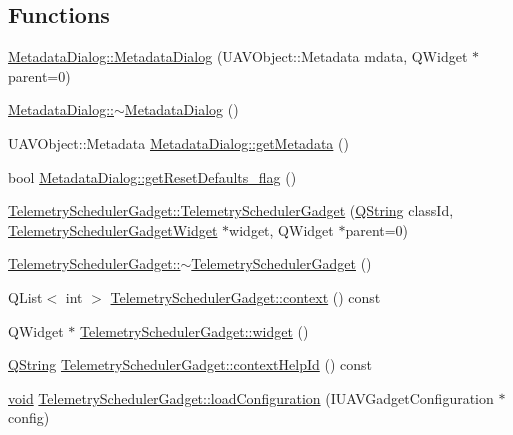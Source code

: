 \subsection*{\-Functions}
\begin{DoxyCompactItemize}
\item 
\hyperlink{group___telemetry_scheduler_gadget_plugin_gae7a09a21f10b02c9cfbeca46cf5f8d3d}{\-Metadata\-Dialog\-::\-Metadata\-Dialog} (\-U\-A\-V\-Object\-::\-Metadata mdata, \-Q\-Widget $\ast$parent=0)
\item 
\hyperlink{group___telemetry_scheduler_gadget_plugin_gae1f623f8f053ac2dc1582cde50cd2d05}{\-Metadata\-Dialog\-::$\sim$\-Metadata\-Dialog} ()
\item 
\-U\-A\-V\-Object\-::\-Metadata \hyperlink{group___telemetry_scheduler_gadget_plugin_ga909d83e32704eef90c21a022a185f359}{\-Metadata\-Dialog\-::get\-Metadata} ()
\item 
bool \hyperlink{group___telemetry_scheduler_gadget_plugin_gac9372736e58b592c6cb67f4c68b3e3ec}{\-Metadata\-Dialog\-::get\-Reset\-Defaults\-\_\-flag} ()
\item 
\hyperlink{group___telemetry_scheduler_gadget_plugin_gad6c9a0ecdc6864a13ced085537fef8de}{\-Telemetry\-Scheduler\-Gadget\-::\-Telemetry\-Scheduler\-Gadget} (\hyperlink{group___u_a_v_objects_plugin_gab9d252f49c333c94a72f97ce3105a32d}{\-Q\-String} class\-Id, \hyperlink{class_telemetry_scheduler_gadget_widget}{\-Telemetry\-Scheduler\-Gadget\-Widget} $\ast$widget, \-Q\-Widget $\ast$parent=0)
\item 
\hyperlink{group___telemetry_scheduler_gadget_plugin_ga045a9c869426c4d02e391a12282b19d7}{\-Telemetry\-Scheduler\-Gadget\-::$\sim$\-Telemetry\-Scheduler\-Gadget} ()
\item 
\-Q\-List$<$ int $>$ \hyperlink{group___telemetry_scheduler_gadget_plugin_ga8e9cbd33ece042bd4191b34c57284b0a}{\-Telemetry\-Scheduler\-Gadget\-::context} () const 
\item 
\-Q\-Widget $\ast$ \hyperlink{group___telemetry_scheduler_gadget_plugin_gad2330b009cb0dafb40f51b3172b11568}{\-Telemetry\-Scheduler\-Gadget\-::widget} ()
\item 
\hyperlink{group___u_a_v_objects_plugin_gab9d252f49c333c94a72f97ce3105a32d}{\-Q\-String} \hyperlink{group___telemetry_scheduler_gadget_plugin_ga7a499df127457e721f0a7513e00c215b}{\-Telemetry\-Scheduler\-Gadget\-::context\-Help\-Id} () const 
\item 
\hyperlink{group___u_a_v_objects_plugin_ga444cf2ff3f0ecbe028adce838d373f5c}{void} \hyperlink{group___telemetry_scheduler_gadget_plugin_gadd7b9b93eab48f561517b14555143819}{\-Telemetry\-Scheduler\-Gadget\-::load\-Configuration} (\-I\-U\-A\-V\-Gadget\-Configuration $\ast$config)

\end{DoxyCompactItemize}
